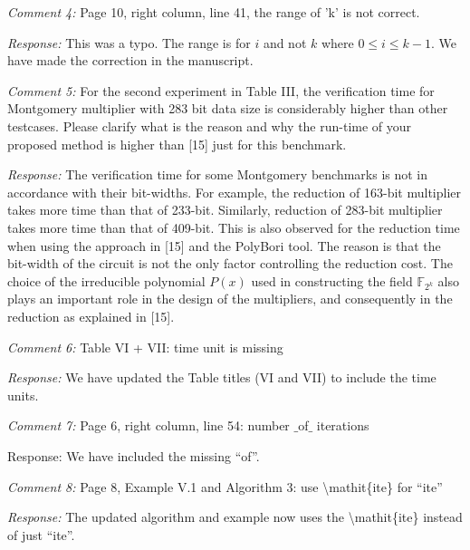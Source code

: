 \documentclass[conference, onecolumn]{IEEEtran}
\begin{document}
\par{\it Comment 4:} Page 10, right column, line 41, the range of 'k' is not correct.
\par{\it Response:} This was a typo. The range is for $i$ and not $k$
where $0 \leq i \leq k-1$. We have made the correction in the
manuscript. 

\par{\it Comment 5:} For the second experiment in Table III, the
verification time for Montgomery multiplier with 283 bit data size is
considerably higher than other testcases. Please clarify what is the
reason and why the run-time of your proposed method is higher than
[15] just for this benchmark. 
\par{\it Response: } The verification time for some Montgomery
benchmarks is not in accordance with their bit-widths. For example,
the reduction of 163-bit  multiplier takes more time than that of
233-bit. Similarly, reduction of 283-bit multiplier takes more time
than that of 409-bit. This is also  observed for the reduction time
when using the approach in [15] and the PolyBori tool. The reason is
that  the bit-width of the circuit is not the only factor controlling
the reduction cost. The choice of the irreducible polynomial $P(x)$
used in constructing the field ${\mathbb{F}}_{2^k}$ also plays an 
important role in the design of the multipliers, and consequently in
the reduction as explained in [15].  

\par{\it Comment 6:} Table VI + VII: time unit is missing
\par{\it Response:} We have updated the Table titles (VI and VII) to include the time units.

\par{\it Comment 7:} Page 6, right column, line 54: number $\_$of$\_$ iterations
\par{Response:} We have included the missing ``of''.

\par{\it Comment 8:} Page 8, Example V.1 and Algorithm 3: use \textbackslash mathit\{ite\} for ``ite''
\par{\it Response:} The updated algorithm and example now uses the
\textbackslash mathit\{ite\} instead of just ``ite''. 




% 
% 
\end{document}
